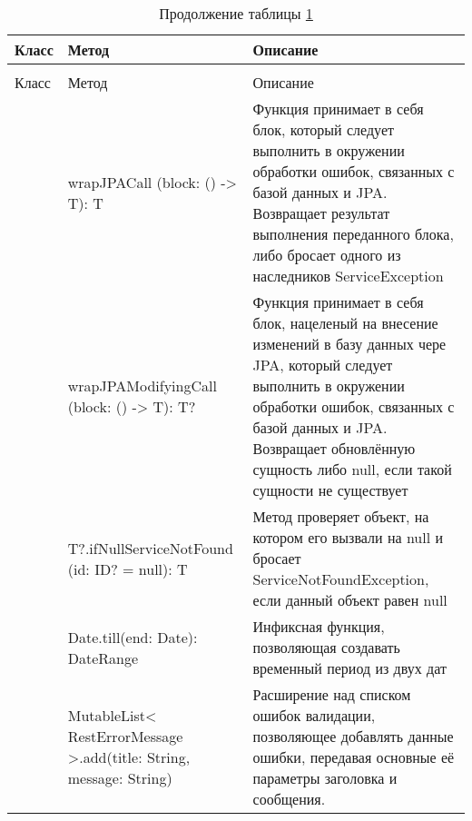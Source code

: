\begin{center}
\begin{longtable}{ 
      | >{\centering}m{} 
      | >{\centering}m{} 
      | >{\centering\arraybackslash}m{}|}
  \caption{Вспомогательные методы}
  \label{table:exception_reference}\\
  \hline Класс & Метод  & Описание\\ \hline
  \endfirsthead
  \caption*{Продолжение таблицы \ref{table:exception_reference}}\\
  \hline 
    Класс & Метод & Описание\\
  \hline
  \endhead
  \hline
  \endfoot
  \hline
  \hline
    \multirow{2}{*}{FunctionsKt}
    & wrapJPACall (block: () -> T): T
    & Функция принимает в себя блок, который следует выполнить в окружении 
    обработки ошибок, связанных с базой данных и JPA. Возвращает результат выполнения переданного блока, 
    либо бросает одного из наследников \mbox{ServiceException}\\
  \cline{2-3}  
    & wrapJPAModifyingCall (block: () -> T): T?
    & Функция принимает в себя блок, нацеленый на внесение изменений в базу данных чере JPA, 
    который следует выполнить в окружении обработки ошибок, связанных с базой данных и JPA. Возвращает обновлённую сущность либо null, если такой сущности не существует\\
  \cline{2-3}  
    & T?.ifNullServiceNotFound (id: ID? = null): T
    & Метод проверяет объект, на котором его вызвали на null и бросает \mbox{ServiceNotFoundException}, 
    если данный объект равен null\\
  \cline{2-3}  
    & Date.till(end: Date): DateRange
    & Инфиксная функция, позволяющая создавать временный период из двух дат\\
      
  \cline{2-3}  
    & MutableList< RestErrorMessage >.add(title: String, message: String)
    & Расширение над списком ошибок валидации, позволяющее добавлять данные ошибки, передавая основные 
    её параметры заголовка и сообщения.\\

\end{longtable}
\end{center}